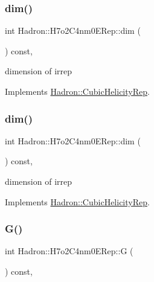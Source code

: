 \subsubsection{\texorpdfstring{dim()}{dim()}\hspace{0.1cm}{\footnotesize\ttfamily [1/2]}}
{\footnotesize\ttfamily int Hadron\+::\+H7o2\+C4nm0\+E\+Rep\+::dim (\begin{DoxyParamCaption}{ }\end{DoxyParamCaption}) const\hspace{0.3cm}{\ttfamily [inline]}, {\ttfamily [virtual]}}

dimension of irrep 

Implements \mbox{\hyperlink{structHadron_1_1CubicHelicityRep_a95d229a05580e65f8bdde74a1e316855}{Hadron\+::\+Cubic\+Helicity\+Rep}}.

\mbox{\label{structHadron_1_1H7o2C4nm0ERep_aed3aeb03b51c80a7ee0d02b8cc1a3ecf}} 
\subsubsection{\texorpdfstring{dim()}{dim()}\hspace{0.1cm}{\footnotesize\ttfamily [2/2]}}
{\footnotesize\ttfamily int Hadron\+::\+H7o2\+C4nm0\+E\+Rep\+::dim (\begin{DoxyParamCaption}{ }\end{DoxyParamCaption}) const\hspace{0.3cm}{\ttfamily [inline]}, {\ttfamily [virtual]}}

dimension of irrep 

Implements \mbox{\hyperlink{structHadron_1_1CubicHelicityRep_a95d229a05580e65f8bdde74a1e316855}{Hadron\+::\+Cubic\+Helicity\+Rep}}.

\mbox{\label{structHadron_1_1H7o2C4nm0ERep_a41ed014e3b78c3dfc40b8e8afee43477}} 
\subsubsection{\texorpdfstring{G()}{G()}\hspace{0.1cm}{\footnotesize\ttfamily [1/2]}}
{\footnotesize\ttfamily int Hadron\+::\+H7o2\+C4nm0\+E\+Rep\+::G (\begin{DoxyParamCaption}{ }\end{DoxyParamCaption}) const\hspace{0.3cm}{\ttfamily [inline]}, {\ttfamily [virtual]}}

